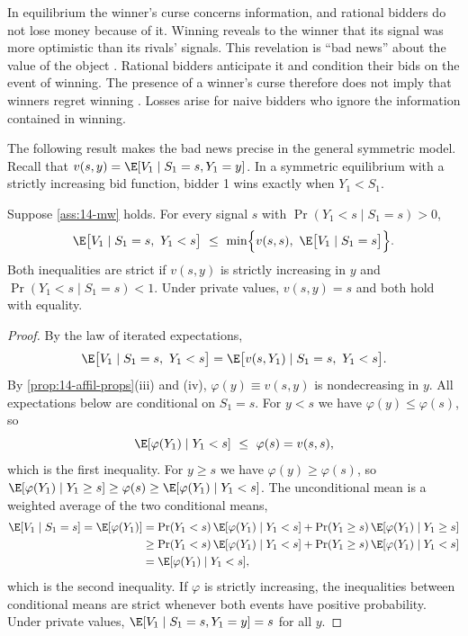 In equilibrium the winner's curse concerns information, and rational bidders do not lose money because of
it. Winning reveals to the winner that its signal was more optimistic than its rivals' signals. This
revelation is ``bad news'' about the value of the object \citep{Milgrom1981}. Rational bidders anticipate it
and condition their bids on the event of winning. The presence of a winner's curse therefore does not imply
that winners regret winning \citep[footnote~7]{AtheyHaile2007}. Losses arise for naive bidders who ignore the
information contained in winning.

The following result makes the bad news precise in the general symmetric model. Recall that
$v(s,y)=\E[V_1\mid S_1=s,Y_1=y]$. In a symmetric equilibrium with a strictly increasing bid function, bidder 1
wins exactly when $Y_1<S_1$.

\begin{proposition}\label{prop:14-wc}
Suppose \cref{ass:14-mw} holds. For every signal $s$ with $\Pr(Y_1<s\mid S_1=s)>0$,
\begin{equation}\label{eq:14-wc}
\E\bigl[V_1\mid S_1=s,\ Y_1<s\bigr]\ \le\ \min\Bigl\{v(s,s),\ \E\bigl[V_1\mid S_1=s\bigr]\Bigr\}.
\end{equation}
Both inequalities are strict if $v(s,y)$ is strictly increasing in $y$ and $\Pr(Y_1<s\mid S_1=s)<1$. Under
private values, $v(s,y)=s$ and both hold with equality.
\end{proposition}

\begin{proof}
By the law of iterated expectations,
\[
\E\bigl[V_1\mid S_1=s,\ Y_1<s\bigr]=\E\bigl[v(s,Y_1)\mid S_1=s,\ Y_1<s\bigr].
\]
By \cref{prop:14-affil-props}(iii) and (iv), $\varphi(y)\equiv v(s,y)$ is nondecreasing in $y$. All expectations
below are conditional on $S_1=s$. For $y<s$ we have $\varphi(y)\le\varphi(s)$, so
\[
\E[\varphi(Y_1)\mid Y_1<s]\ \le\ \varphi(s)=v(s,s),
\]
which is the first inequality. For $y\ge s$ we have $\varphi(y)\ge\varphi(s)$, so
$\E[\varphi(Y_1)\mid Y_1\ge s]\ge\varphi(s)\ge\E[\varphi(Y_1)\mid Y_1<s]$. The unconditional mean is a weighted
average of the two conditional means,
\begin{align*}
\E[V_1\mid S_1=s]=\E[\varphi(Y_1)]
&=\Pr(Y_1<s)\,\E[\varphi(Y_1)\mid Y_1<s]+\Pr(Y_1\ge s)\,\E[\varphi(Y_1)\mid Y_1\ge s]\\
&\ge\Pr(Y_1<s)\,\E[\varphi(Y_1)\mid Y_1<s]+\Pr(Y_1\ge s)\,\E[\varphi(Y_1)\mid Y_1< s]\\
&=\E[\varphi(Y_1)\mid Y_1<s],
\end{align*}
which is the second inequality. If $\varphi$ is strictly increasing, the inequalities between conditional
means are strict whenever both events have positive probability. Under private values,
$\E[V_1\mid S_1=s,Y_1=y]=s$ for all $y$.
\end{proof}

